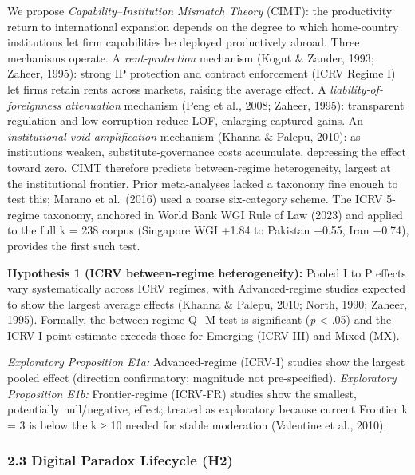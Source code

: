\documentclass[
  12pt,a4paper]{article}
\begin{document}
We propose \emph{Capability--Institution Mismatch Theory} (CIMT): the
productivity return to international expansion depends on the degree to
which home-country institutions let firm capabilities be deployed
productively abroad. Three mechanisms operate. A \emph{rent-protection}
mechanism (Kogut \& Zander, 1993; Zaheer, 1995): strong IP protection
and contract enforcement (ICRV Regime I) let firms retain rents across
markets, raising the average effect. A \emph{liability-of-foreignness
attenuation} mechanism (Peng et al., 2008; Zaheer, 1995): transparent
regulation and low corruption reduce LOF, enlarging captured gains. An
\emph{institutional-void amplification} mechanism (Khanna \& Palepu,
2010): as institutions weaken, substitute-governance costs accumulate,
depressing the effect toward zero. CIMT therefore predicts
between-regime heterogeneity, largest at the institutional frontier.
Prior meta-analyses lacked a taxonomy fine enough to test this; Marano
et al.~(2016) used a coarse six-category scheme. The ICRV 5-regime
taxonomy, anchored in World Bank WGI Rule of Law (2023) and applied to
the full k = 238 corpus (Singapore WGI +1.84 to Pakistan −0.55, Iran
−0.74), provides the first such test.

\textbf{Hypothesis 1 (ICRV between-regime heterogeneity):} Pooled I to P
effects vary systematically across ICRV regimes, with Advanced-regime
studies expected to show the largest average effects (Khanna \& Palepu,
2010; North, 1990; Zaheer, 1995). Formally, the between-regime Q\_M test
is significant (\emph{p} \textless{} .05) and the ICRV-I point estimate
exceeds those for Emerging (ICRV-III) and Mixed (MX).

\emph{Exploratory Proposition E1a:} Advanced-regime (ICRV-I) studies
show the largest pooled effect (direction confirmatory; magnitude not
pre-specified). \emph{Exploratory Proposition E1b:} Frontier-regime
(ICRV-FR) studies show the smallest, potentially null/negative, effect;
treated as exploratory because current Frontier k = 3 is below the k ≥
10 needed for stable moderation (Valentine et al., 2010).

\hypertarget{digital-paradox-lifecycle-h2}{%
\subsubsection{2.3 Digital Paradox Lifecycle
(H2)}\label{digital-paradox-lifecycle-h2}}
\end{document}
